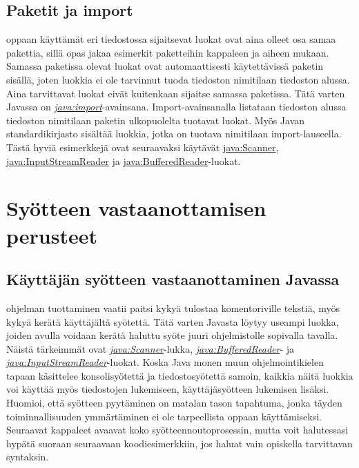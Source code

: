 \documentclass[a4paper,justified,notoc]{tufte-book}
\newcommand{\java}[1]{\underline{\gls{java:#1}}}
\newcommand{\newjava}[1]{\textit{\java{#1}}}
\begin{document}
\begin{fullwidth}
\subsection{Paketit ja import}
\label{import}

 oppaan käyttämät eri tiedostossa sijaitsevat luokat ovat aina olleet
osa samaa pakettia, sillä opas jakaa esimerkit paketteihin kappaleen ja aiheen mukaan. Samassa
paketissa olevat luokat ovat automaattisesti käytettävissä paketin sisällä, joten luokkia ei ole
tarvinnut tuoda tiedoston nimitilaan tiedoston alussa. Aina tarvittavat luokat eivät kuitenkaan
sijaitse samassa paketissa. Tätä varten Javassa on \newjava{import}-avainsana. Import-avainsanalla
listataan tiedoston alussa tiedoston nimitilaan paketin ulkopuolelta tuotavat luokat. Myös Javan
standardikirjasto sisältää luokkia, jotka on tuotava nimitilaan import-lauseella. Tästä hyviä
esimerkkejä ovat seuraavaksi käytävät \java{Scanner}, \java{InputStreamReader} ja
\java{BufferedReader}-luokat.


\section{Syötteen vastaanottamisen perusteet}
\label{syötteestä}

\subsection{Käyttäjän syötteen vastaanottaminen Javassa}
\label{input}

 ohjelman tuottaminen vaatii paitsi kykyä tulostaa
komentoriville tekstiä, myös kykyä kerätä käyttäjältä syötettä. Tätä varten Javasta löytyy
useampi luokka, joiden avulla voidaan kerätä haluttu syöte juuri ohjelmistolle sopivalla tavalla.
Näistä tärkeimmät ovat \newjava{Scanner}-lukka, \newjava{BufferedReader}- ja
\newjava{InputStreamReader}-luokat. Koska Java monen muun ohjelmointikielen tapaan käsittelee
konsolisyötettä ja tiedostosyötettä samoin, kaikkia näitä luokkia voi käyttää myös tiedostojen
lukemiseen, käyttäjäsyötteen lukemisen lisäksi. Huomioi, että syötteen pyytäminen on matalan
tason tapahtuma, jonka täyden toiminnallisuuden ymmärtäminen ei ole tarpeellista oppaan
käyttämiseksi. Seuraavat kappaleet avaavat koko syötteennoutoprosessin, mutta voit halutessasi
hypätä suoraan seuraavaan koodiesimerkkiin, jos haluat vain opiskella tarvittavan syntaksin.


\end{fullwidth}
\end{document}

